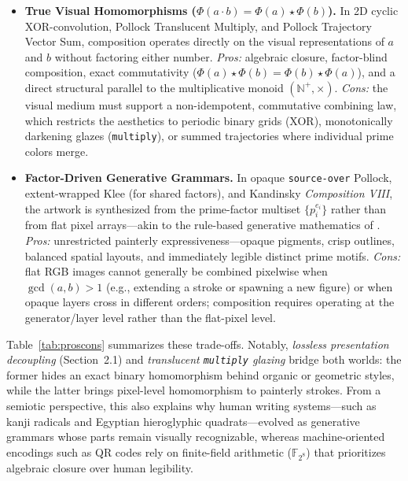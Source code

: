 \documentclass[]{interact}
\theoremstyle{plain}
\theoremstyle{definition}
\theoremstyle{remark}
\begin{document}
\begin{itemize}
  \item \textbf{True Visual Homomorphisms ($\Phi(a \cdot b) = \Phi(a) \star \Phi(b)$).}
  In 2D cyclic XOR-convolution, Pollock Translucent Multiply, and Pollock Trajectory Vector Sum, composition operates directly on the visual representations of $a$ and $b$ without factoring either number.
  \emph{Pros:} algebraic closure, factor-blind composition, exact commutativity ($\Phi(a) \star \Phi(b) = \Phi(b) \star \Phi(a)$), and a direct structural parallel to the multiplicative monoid $(\mathbb{N}^+, \times)$.
  \emph{Cons:} the visual medium must support a non-idempotent, commutative combining law, which restricts the aesthetics to periodic binary grids (XOR), monotonically darkening glazes (\texttt{multiply}), or summed trajectories where individual prime colors merge.

  \item \textbf{Factor-Driven Generative Grammars.}
  In opaque \texttt{source-over} Pollock, extent-wrapped Klee (for shared factors), and Kandinsky \emph{Composition VIII}, the artwork is synthesized from the prime-factor multiset $\{p_i^{e_i}\}$ rather than from flat pixel arrays—akin to the rule-based generative mathematics of \citet{franke1993generative}.
  \emph{Pros:} unrestricted painterly expressiveness—opaque pigments, crisp outlines, balanced spatial layouts, and immediately legible distinct prime motifs.
  \emph{Cons:} flat RGB images cannot generally be combined pixelwise when $\gcd(a,b) > 1$ (e.g., extending a stroke or spawning a new figure) or when opaque layers cross in different orders; composition requires operating at the generator/layer level rather than the flat-pixel level.
\end{itemize}

Table~\ref{tab:proscons} summarizes these trade-offs. Notably, \emph{lossless presentation decoupling} (Section~2.1) and \emph{translucent \texttt{multiply} glazing} bridge both worlds: the former hides an exact binary homomorphism behind organic or geometric styles, while the latter brings pixel-level homomorphism to painterly strokes. From a semiotic perspective, this also explains why human writing systems—such as kanji radicals and Egyptian hieroglyphic quadrats—evolved as generative grammars whose parts remain visually recognizable, whereas machine-oriented encodings such as QR codes rely on finite-field arithmetic ($\mathbb{F}_{2^8}$) that prioritizes algebraic closure over human legibility.
\end{document}
